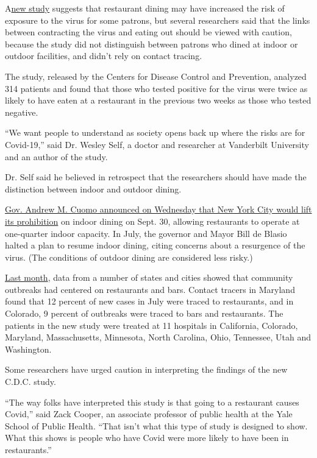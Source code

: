 A\href{https://www.cdc.gov/mmwr/volumes/69/wr/mm6936a5.htm?s_cid=mm6936a5_x}{new
study} suggests that restaurant dining may have increased the risk of
exposure to the virus for some patrons, but several researchers said
that the links between contracting the virus and eating out should be
viewed with caution, because the study did not distinguish between
patrons who dined at indoor or outdoor facilities, and didn't rely on
contact tracing.

The study, released by the Centers for Disease Control and Prevention,
analyzed 314 patients and found that those who tested positive for the
virus were twice as likely to have eaten at a restaurant in the previous
two weeks as those who tested negative.

``We want people to understand as society opens back up where the risks
are for Covid-19,'' said Dr. Wesley Self, a doctor and researcher at
Vanderbilt University and an author of the study.

Dr. Self said he believed in retrospect that the researchers should have
made the distinction between indoor and outdoor dining.

\href{https://www.nytimes3xbfgragh.onion/2020/09/09/nyregion/indoor-dining-coronavirus.html}{Gov.
Andrew M. Cuomo announced on Wednesday that New York City would lift its
prohibition} on indoor dining on Sept. 30, allowing restaurants to
operate at one-quarter indoor capacity. In July, the governor and Mayor
Bill de Blasio halted a plan to resume indoor dining, citing concerns
about a resurgence of the virus. (The conditions of outdoor dining are
considered less risky.)

\href{https://www.nytimes3xbfgragh.onion/2020/08/12/health/Covid-restaurants-bars.html}{Last
month}, data from a number of states and cities showed that community
outbreaks had centered on restaurants and bars. Contact tracers in
Maryland found that 12 percent of new cases in July were traced to
restaurants, and in Colorado, 9 percent of outbreaks were traced to bars
and restaurants. The patients in the new study were treated at 11
hospitals in California, Colorado, Maryland, Massachusetts, Minnesota,
North Carolina, Ohio, Tennessee, Utah and Washington.

Some researchers have urged caution in interpreting the findings of the
new C.D.C. study.

``The way folks have interpreted this study is that going to a
restaurant causes Covid,'' said Zack Cooper, an associate professor of
public health at the Yale School of Public Health. ``That isn't what
this type of study is designed to show. What this shows is people who
have Covid were more likely to have been in restaurants.''

